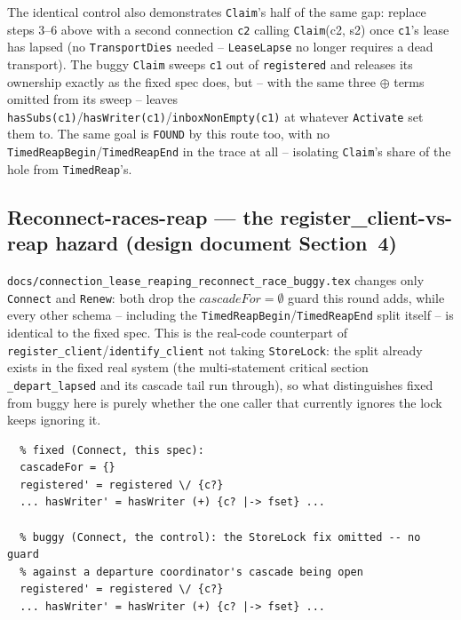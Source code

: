 \documentclass[a4paper,10pt,fleqn]{article}
\begin{document}
The identical control also demonstrates \texttt{Claim}'s half of the same
gap: replace steps 3--6 above with a second connection \texttt{c2} calling
\texttt{Claim}(c2, s2) once \texttt{c1}'s lease has lapsed (no
\texttt{TransportDies} needed -- \texttt{LeaseLapse} no longer requires a
dead transport). The buggy \texttt{Claim} sweeps \texttt{c1} out of
\texttt{registered} and releases its ownership exactly as the fixed spec
does, but -- with the same three \(\oplus\) terms omitted from its sweep --
leaves \texttt{hasSubs(c1)}/\texttt{hasWriter(c1)}/\texttt{inboxNonEmpty(c1)}
at whatever \texttt{Activate} set them to. The same goal is \texttt{FOUND}
by this route too, with no \texttt{TimedReapBegin}/\texttt{TimedReapEnd}
in the trace at all -- isolating \texttt{Claim}'s share of the hole from
\texttt{TimedReap}'s.

\subsection{Reconnect-races-reap --- the register\_client-vs-reap hazard
(design document Section~4)}
\label{sec:fidelity-reconnect-race}

\texttt{docs/connection\_lease\_reaping\_reconnect\_race\_buggy.tex}
changes only \texttt{Connect} and \texttt{Renew}: both drop the
\texttt{$cascadeFor = \emptyset$} guard this round adds, while every other
schema -- including the \texttt{TimedReapBegin}/\texttt{TimedReapEnd}
split itself -- is identical to the fixed spec. This is the real-code
counterpart of \texttt{register\_client}/\texttt{identify\_client} not
taking \texttt{StoreLock}: the split already exists in the fixed real
system (the multi-statement critical section \texttt{\_depart\_lapsed} and
its cascade tail run through), so what distinguishes fixed from buggy here
is purely whether the one caller that currently ignores the lock keeps
ignoring it.

\begin{verbatim}
  % fixed (Connect, this spec):
  cascadeFor = {}
  registered' = registered \/ {c?}
  ... hasWriter' = hasWriter (+) {c? |-> fset} ...

  % buggy (Connect, the control): the StoreLock fix omitted -- no guard
  % against a departure coordinator's cascade being open
  registered' = registered \/ {c?}
  ... hasWriter' = hasWriter (+) {c? |-> fset} ...
\end{verbatim}
\end{document}
